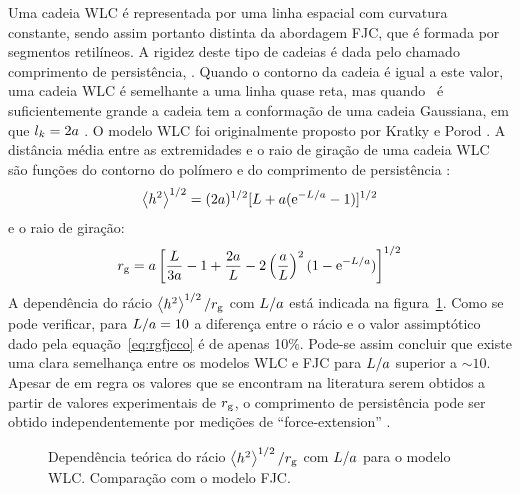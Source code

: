 %
%
Uma cadeia WLC é representada por uma linha espacial com curvatura constante, sendo assim portanto distinta da abordagem FJC, que é formada por segmentos retilíneos. A rigidez deste tipo de cadeias é dada pelo chamado comprimento de persistência, \persis.
%
Quando o contorno da cadeia é igual a este valor, uma cadeia WLC é semelhante a uma linha quase reta, mas quando \contorno\ é suficientemente grande a cadeia tem a conformação de uma cadeia Gaussiana, em que $l_{k}=2a$ \cite{tager,teraoka,hagerman}. O modelo WLC foi originalmente proposto por Kratky e Porod \cite{kratky}. A distância média entre as extremidades e o raio de giração de uma cadeia WLC são funções do contorno do polímero e do comprimento de persistência \cite{teraoka}:
%
\begin{equation}
\label{eq:endtoendwlc}
\left\langle h^{2}\right\rangle^{1/2}=(2a)^{1/2}[L+a(\mathrm{e}^{-L/a}-1)]^{1/2}
\end{equation}  
e o raio de giração:
%
\begin{equation}
\label{eq:rgwlc}
r_{\mathrm{g}}=a\left[\frac{L}{3a}-1+\frac{2a}{L}-2\left(\frac{a}{L}\right)^{2}(1-\mathrm{e}^{-L/a})\right]^{1/2}
\end{equation}
A dependência do rácio $\distanciah/\raiogiracao$ com $\contorno/\persis$ está indicada na figura~\ref{fig:1art1}. Como se pode verificar, para $L/a=10$ a diferença entre o rácio e o valor assimptótico dado pela equação~\ref{eq:rgfjcco} é de apenas 10\%. Pode-se assim concluir que existe uma clara semelhança entre os modelos WLC e FJC para $\contorno/\persis$ superior a $\sim 10$. Apesar de em regra os valores que se encontram na literatura serem obtidos a partir de valores experimentais de $r_{\mathrm{g}}$, o comprimento de persistência pode ser obtido independentemente por medições de ``force-extension'' \cite{lail,bouchiat}.
%
\begin{figure}
	\centering
	\setlength\figureheight{6cm} 
	\setlength\figurewidth{6cm}
	
	\caption[Depedência do rácio $\distanciah/\raiogiracao$ com $\contorno/\persis$ para o modelo WLC]{Dependência teórica do rácio $\distanciah/\raiogiracao$ com $\contorno/\persis$ para o modelo WLC. Comparação com o modelo FJC.}
	\label{fig:1art1}
\end{figure}

